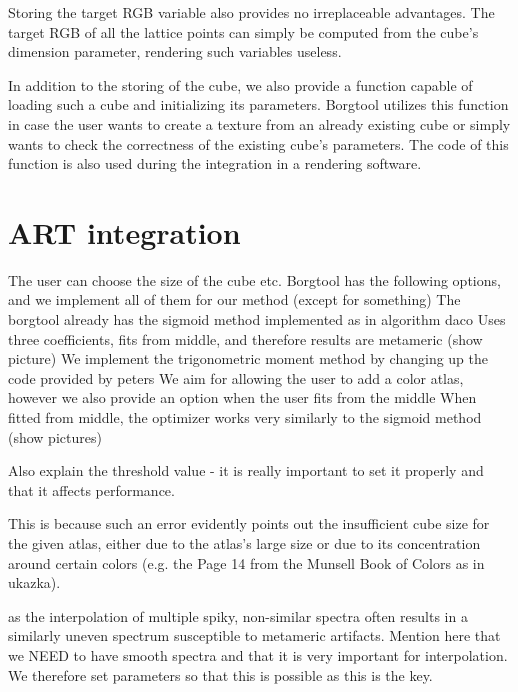 Storing the target RGB variable also provides no irreplaceable advantages. The target RGB of all the lattice points can simply be computed from the cube's dimension parameter, rendering such variables useless.

In addition to the storing of the cube, we also provide a function capable of loading such a cube and initializing its parameters. Borgtool utilizes this function in case the user wants to create a texture from an already existing cube or simply wants to check the correctness of the existing cube's parameters. The code of this function is also used during the integration in a rendering software.

\section{ART integration}

The user can choose the size of the cube etc. Borgtool has the following options, and we implement all of them for our method (except for something)
The borgtool already has the sigmoid method implemented as in algorithm daco
Uses three coefficients, fits from middle, and therefore results are metameric (show picture)
We implement the trigonometric moment method by changing up the code provided by peters
We aim for allowing the user to add a color atlas, however we also provide an option when the user fits from the middle
When fitted from middle, the optimizer works very similarly to the sigmoid method (show pictures)

Also explain the threshold value - it is really important to set it properly and that it affects performance.

This is because such an error evidently points out the insufficient cube size for the given atlas, either due to the atlas's large size or due to its concentration around certain colors (e.g. the Page 14 from the Munsell Book of Colors as in ukazka).

 as the interpolation of multiple spiky, non-similar spectra often results in a similarly uneven spectrum susceptible to metameric artifacts. Mention here that we NEED to have smooth spectra and that it is very important for interpolation. We therefore set parameters so that this is possible as this is the key. 
